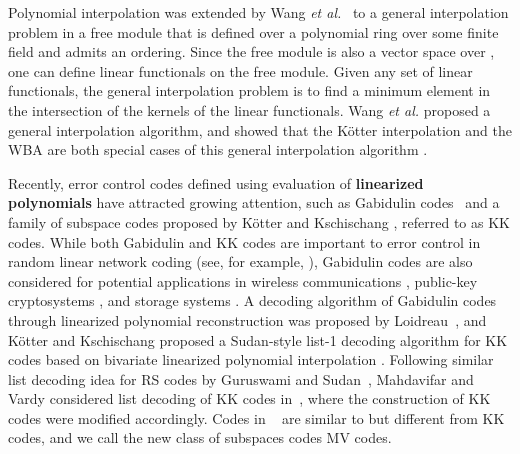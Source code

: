 \documentclass[11pt,onecolumn,draftcls]{IEEEtran}
\begin{document}
Polynomial interpolation was extended by Wang \emph{et al.}~\cite{WangMcEliece05} to a general interpolation problem in a free module that is defined over a polynomial ring over some finite field  and admits an ordering. Since the free module is also a vector space over , one can define linear functionals on the free module. Given any set of linear functionals, the general interpolation problem is to find a minimum element in the intersection of the kernels of the linear functionals. Wang \emph{et al.} proposed a general interpolation algorithm, and showed that the K\"{o}tter interpolation and the WBA are both special cases of this general interpolation algorithm \cite{WangMcEliece05}.

Recently, error control codes defined using evaluation of \textbf{linearized polynomials} have attracted growing attention, such as Gabidulin codes~\cite{gabidulin_pit0185} and a family of subspace codes proposed by K\"{o}tter and Kschischang \cite{kotter_it08}, referred to as KK codes. While both Gabidulin and KK codes are important to error control in random linear network coding (see, for example, \cite{kotter_it08,silva_it08,silva_it09}), Gabidulin codes are also considered for potential applications in wireless communications \cite{lusina_it03}, public-key cryptosystems \cite{gabidulin_lncs91}, and storage systems
\cite{gabidulin_pit0285, RothBookRS}. A decoding algorithm of Gabidulin codes through linearized polynomial reconstruction was proposed by Loidreau~\cite{loidreau_wcc05}, and K\"{o}tter and Kschischang proposed a Sudan-style list-1 decoding algorithm for KK codes based on bivariate linearized polynomial interpolation \cite{kotter_it08}. Following similar list decoding idea for RS codes by Guruswami and Sudan~\cite{GS99}, Mahdavifar and Vardy considered list decoding of KK codes in~\cite{mahdavifar_isit10}\cite{mahdavifar_it10}, where the construction of KK codes were modified accordingly. Codes in ~\cite{mahdavifar_isit10}\cite{mahdavifar_it10} are similar to but different from KK codes, and we call the new class of subspaces codes MV codes.
\end{document}
